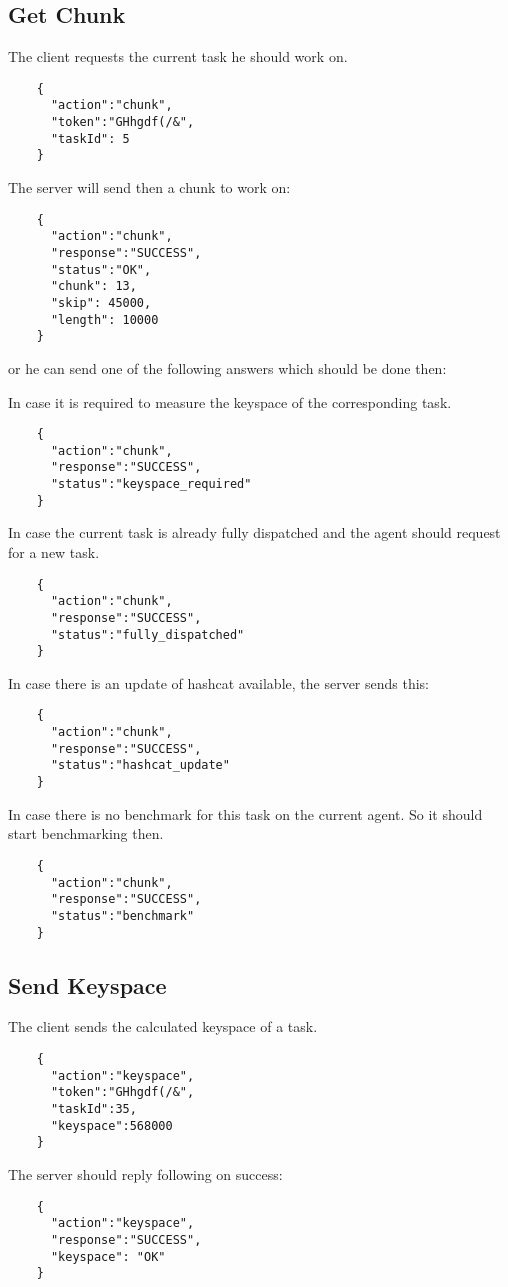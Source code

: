 \documentclass{article}
\begin{document}
	\subsection*{Get Chunk}
	The client requests the current task he should work on.
	\begin{verbatim}
	{
	  "action":"chunk", 
	  "token":"GHhgdf(/&",
	  "taskId": 5
	}
	\end{verbatim}
	The server will send then a chunk to work on:
	\begin{verbatim}
	{
	  "action":"chunk",
	  "response":"SUCCESS",
	  "status":"OK",
	  "chunk": 13,
	  "skip": 45000,
	  "length": 10000
	}
	\end{verbatim}
	or he can send one of the following answers which should be done then:
	
	In case it is required to measure the keyspace of the corresponding task.
	\begin{verbatim}
	{
	  "action":"chunk",
	  "response":"SUCCESS",
	  "status":"keyspace_required"
	}
	\end{verbatim}
	
	In case the current task is already fully dispatched and the agent should request for a new task.
	\begin{verbatim}
	{
	  "action":"chunk",
	  "response":"SUCCESS",
	  "status":"fully_dispatched"
	}
	\end{verbatim}
	
	In case there is an update of hashcat available, the server sends this:
	\begin{verbatim}
	{
	  "action":"chunk",
	  "response":"SUCCESS",
	  "status":"hashcat_update"
	}
	\end{verbatim}
	
	In case there is no benchmark for this task on the current agent. So it should start benchmarking then.
	\begin{verbatim}
	{
	  "action":"chunk",
	  "response":"SUCCESS",
	  "status":"benchmark"
	}
	\end{verbatim}
	
	
	\subsection*{Send Keyspace}
	The client sends the calculated keyspace of a task.
	\begin{verbatim}
	{
	  "action":"keyspace",
	  "token":"GHhgdf(/&",
	  "taskId":35,
	  "keyspace":568000
	}
	\end{verbatim}
	The server should reply following on success:
	\begin{verbatim}
	{
	  "action":"keyspace",
	  "response":"SUCCESS",
	  "keyspace": "OK"
	}
	\end{verbatim}
	
\end{document}
